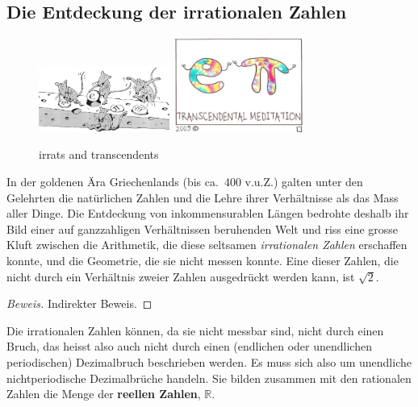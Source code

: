 \documentclass[%
11pt,%
twoside,%
titlepage,%
german,%
headsepline%
]{scrartcl}
\begin{document}
\subsection{Die Entdeckung der irrationalen Zahlen}
\begin{figure}
  \begin{center}
    \includegraphics[width=0.382\textwidth]{pictures/irratzahlen}\hspace{2cm}
    \includegraphics[width=0.382\textwidth]{pictures/transzendent}
  \end{center}
\caption{irrats and transcendents}
\end{figure}
In der goldenen Ära Griechenlands (bis ca.\ 400 v.u.Z.) galten unter den Gelehrten die natürlichen Zahlen und die Lehre ihrer Verhältnisse als das Mass aller Dinge. Die
Entdeckung von inkommensurablen Längen bedrohte deshalb ihr Bild
einer auf ganzzahligen Verhältnissen beruhenden Welt und riss eine
grosse Kluft zwischen die Arithmetik, die diese seltsamen \emph{irrationalen Zahlen} erschaffen konnte, und die Geometrie, die sie
nicht messen konnte. Eine dieser Zahlen, die nicht durch ein
Verhältnis zweier Zahlen ausgedrückt werden kann, ist $\sqrt{2}$.

\begin{proof}[Beweis]
Indirekter
Beweis.
\end{proof}

Die irrationalen Zahlen können, da sie nicht messbar sind, nicht durch einen Bruch, das heisst also auch nicht durch einen (endlichen oder unendlichen periodischen) Dezimalbruch beschrieben
werden. Es muss sich also um unendliche nichtperiodische Dezimalbrüche handeln. Sie bilden zusammen mit den rationalen Zahlen die Menge der \textbf{reellen Zahlen}, $\mathbb{R}$. 
\end{document}
